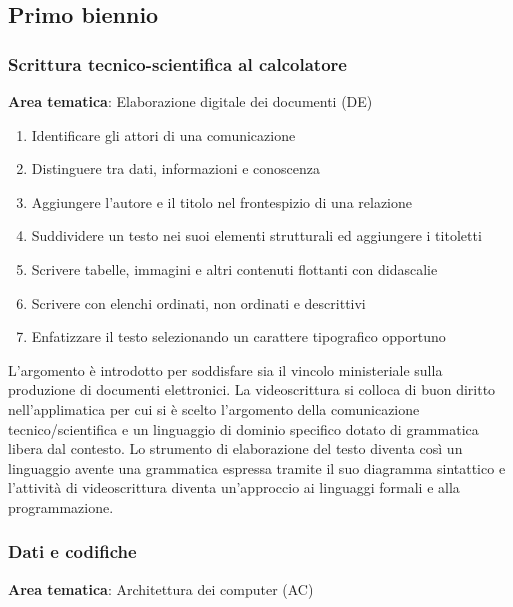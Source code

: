 
\subsection{Primo biennio}
\label{sec:primo-biennio}

\subsubsection[Scrittura tecnico-scientifica]{Scrittura tecnico-scientifica al calcolatore}
\label{sec:scrittura-tecnico-scientifica}

\noindent\textbf{Area tematica}: Elaborazione digitale dei documenti (DE)

    
\begin{enumerate}
  \item Identificare gli attori di una comunicazione
  \item Distinguere tra dati, informazioni e conoscenza
  \item Aggiungere l'autore e il titolo nel frontespizio di una relazione
  \item Suddividere un testo nei suoi elementi strutturali ed aggiungere i titoletti
  \item Scrivere tabelle, immagini e altri contenuti flottanti con didascalie
  \item Scrivere con elenchi ordinati, non ordinati e descrittivi
  \item Enfatizzare il testo selezionando un carattere tipografico opportuno
\end{enumerate}

L'argomento è introdotto per soddisfare sia il vincolo ministeriale sulla produzione di documenti elettronici.
La videoscrittura si colloca di buon diritto nell'applimatica per cui si è scelto l'argomento della comunicazione tecnico/scientifica
e un linguaggio di dominio specifico dotato di grammatica libera dal contesto.
Lo strumento di elaborazione del testo diventa così un linguaggio avente una grammatica espressa tramite il suo diagramma sintattico
e l'attività di videoscrittura diventa un'approccio ai linguaggi formali e alla programmazione.

\subsubsection[Dati e codifiche]{Dati e codifiche}
\label{sec:dati-e codifiche}

\noindent\textbf{Area tematica}: Architettura dei computer (AC)

